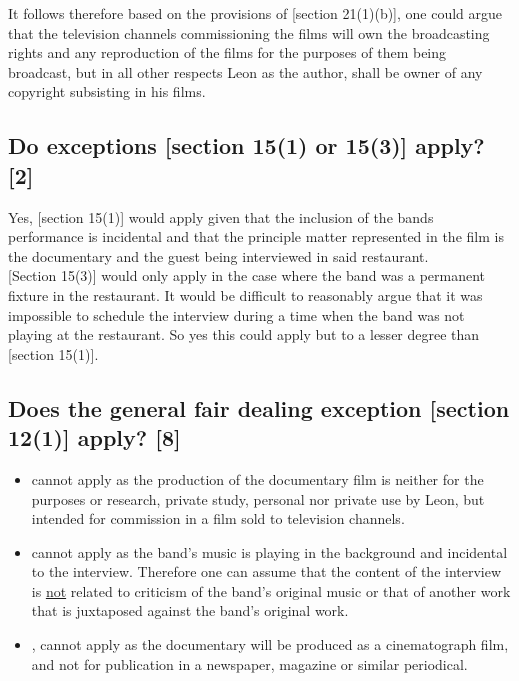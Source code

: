\documentclass[11pt]{article}
\begin{document}
It follows therefore based on the provisions of [section 21(1)(b)]\cite{rsa78_copyrightact}, one could
argue that the television channels commissioning the films will own the
broadcasting rights and any reproduction of the films for the purposes of them
being broadcast, but in all other respects Leon as the author, shall be owner of
any copyright subsisting in his films.

\subsection{Do exceptions [section 15(1) or 15(3)]\cite{rsa78_copyrightact} apply? [2]}
\label{sec:orgcf6e0ce}
Yes, [section 15(1)]\cite{rsa78_copyrightact} would apply given that the inclusion
of the bands performance is incidental and that the principle matter represented
in the film is the documentary and the guest being interviewed in said
restaurant.\\

[Section 15(3)]\cite{rsa78_copyrightact} would only apply in the case where the
band was a permanent fixture in the restaurant. It would be difficult to
reasonably argue that it was impossible to schedule the interview during a time
when the band was not playing at the restaurant. So yes this could apply but to
a lesser degree than [section 15(1)]\cite{rsa78_copyrightact}.

\subsection{Does the general fair dealing exception [section 12(1)]\cite{rsa78_copyrightact} apply? [8]}
\label{sec:org1bfc894}

\begin{itemize}
\item\relax [Section 12(1)(a)]\cite{rsa78_copyrightact} cannot apply as the production of
the documentary film is neither for the purposes or research, private study,
personal nor private use by Leon, but intended for commission in a film sold
to television channels.

\item\relax [Section 12(1)(b)]\cite{rsa78_copyrightact} cannot apply as the band's music is
playing in the background and incidental to the interview. Therefore one can
assume that the content of the interview is \uline{not} related to criticism of the
band's original music or that of another work that is juxtaposed against the
band's original work.

\item\relax [Section 12(1)(c)(i)]\cite{rsa78_copyrightact}, cannot apply as the
documentary will be produced as a cinematograph film, and not for publication
in a newspaper, magazine or similar periodical.
\end{itemize}
\end{document}
